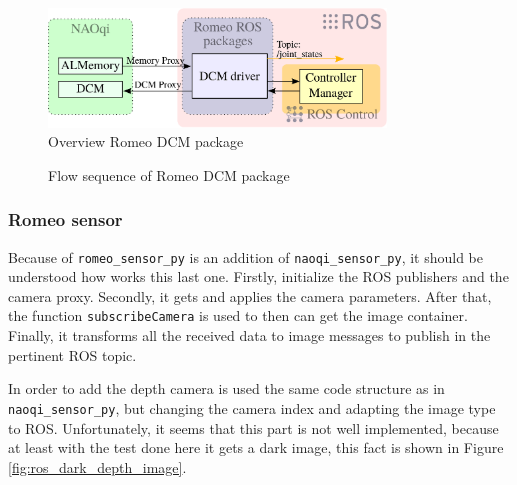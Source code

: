\documentclass[12pt,a4paper,final,twoside,openright]{report}
\begin{document}
\begin{figure}[h]
\centering
\includegraphics[width=0.8\textwidth]{images/dcm_driver.eps}
\caption{Overview Romeo DCM package\label{fig:dcm_driver}}
\end{figure}

\begin{figure}[h]
\centering

\caption{Flow sequence of Romeo DCM package\label{fig:dcm_driver_flow}}
\end{figure}

\newpage
\subsubsection{Romeo sensor}


Because of \texttt{romeo\_sensor\_py} is an addition of \texttt{naoqi\_sensor\_py}, it should be understood how works this last one. Firstly, initialize the ROS publishers and the camera proxy. Secondly, it gets and applies the camera parameters. After that, the function \texttt{subscribeCamera} is used to then can get the image container. Finally, it transforms all the received data to image messages to publish in the pertinent ROS topic. 

In order to add the depth camera is used the same code structure as in \texttt{naoqi\_sensor\_py}, but changing the camera index and adapting the image type to ROS. Unfortunately, it seems that this part is not well implemented, because at least with the test done here it gets a dark image, this fact is shown in Figure \ref{fig:ros_dark_depth_image}.  
\end{document}
